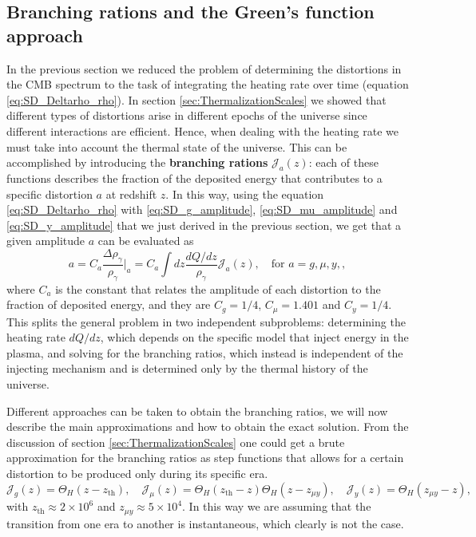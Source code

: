 \subsection{Branching rations and the Green's function approach}
In the previous section we reduced the problem of determining the distortions in the CMB spectrum to the task of integrating the heating rate over time (equation \eqref{eq:SD_Deltarho_rho}). In section \ref{sec:ThermalizationScales} we showed that different types of distortions arise in different epochs of the universe since different interactions are efficient. Hence, when dealing with the heating rate we must take into account the thermal state of the universe. This can be accomplished by introducing the \textbf{branching rations} $\mathcal{J}_a(z)$: each of these functions describes the fraction of the deposited energy that contributes to a specific distortion $a$ at redshift $z$. In this way, using the equation \eqref{eq:SD_Deltarho_rho} with \eqref{eq:SD_g_amplitude}, \eqref{eq:SD_mu_amplitude} and \eqref{eq:SD_y_amplitude} that we just derived in the previous section, we get that a given amplitude $a$ can be evaluated as
\begin{equation}
    a=C_a\frac{\Delta\rho_\gamma}{\rho_\gamma}\bigg|_a=C_a\int dz\frac{dQ/dz}{\rho_\gamma}\mathcal{J}_a(z),\quad\text{for } a=g,\mu,y,\label{eq:SD_amplitude_branching},
\end{equation}
where $C_a$ is the constant that relates the amplitude of each distortion to the fraction of deposited energy, and they are $C_g=1/4$, $C_\mu=1.401$ and $C_y=1/4$.\\
This splits the general problem in two independent subproblems: determining the heating rate $d Q/dz$, which depends on the specific model that inject energy in the plasma, and solving for the branching ratios, which instead is independent of the injecting mechanism and is determined only by the thermal history of the universe.

Different approaches can be taken to obtain the branching ratios, we will now describe the main approximations and how to obtain the exact solution. From the discussion of section \ref{sec:ThermalizationScales} one could get a brute approximation for the branching ratios as step functions that allows for a certain distortion to be produced only during its specific era.
\begin{equation}
    \mathcal{J}_g(z)=\Theta_{H}(z-z_\text{th}),\quad \mathcal{J}_\mu(z)=\Theta_{H}(z_\text{th}-z)\Theta_{H}(z-z_{\mu y}),\quad \mathcal{J}_y(z)=\Theta_{H}(z_{\mu y}-z),
\end{equation}
with $z_\text{th}\approx2\times10^6$ and $z_{\mu y}\approx5\times10^4$.
In this way we are assuming that the transition from one era to another is instantaneous, which clearly is not the case. 

